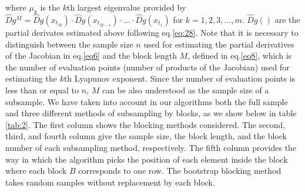 \noindent where ${\mu _k}$ is the $k$th largest eigenvalue provided by $\hat D{g^M} = \hat Dg\left( {{ x_{{t_M}}}} \right) \cdot \hat Dg\left( {{x_{{t_{M - 1}}}}} \right) \cdot  \ldots  \cdot \hat Dg\left( {{ x_{{t_1}}}} \right)$ for $k = 1,2,3, \ldots, m$. $\hat Dg\left( {} \right)$ are the partial derivates estimated above following eq.\ref{eq:28}. Note that it is necessary to distinguish between the sample size $n$ used for estimating the partial derivatives of the Jacobian in eq.\ref{eq6} and the block length $M$, defined in eq.\ref{eq8}, which is the number of evaluation points (number of products of the Jacobian) used for estimating the $k$th Lyapunov exponent. Since the number of evaluation points is less than or equal to $n$, $M$ can be also understood as the sample size of a subsample. We have taken into account in our algorithms both the full sample and three different methods of subsampling by blocks, as we show below in table \ref{tab:2}. The first column shows the blocking methods considered. The second, third, and fourth column give the sample size, the block length, and the block number of each subsampling method, respectively. The fifth column provides the way in which the algorithm picks the position of each element inside the block where each block $B$ corresponds to one row. The bootstrap blocking method takes random samples without replacement by each block. 


